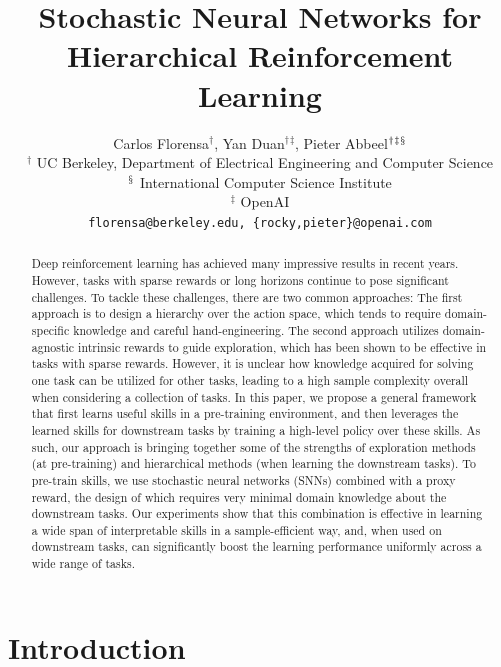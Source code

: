 \documentclass{article} %
\title{Stochastic Neural Networks for \\Hierarchical Reinforcement Learning}
\author{Carlos Florensa${^\dagger}$, Yan Duan${^\dagger}{^\ddagger}$, Pieter Abbeel${^\dagger}{^\ddagger}{^\mathsection}$ \\
$^\dagger$ UC Berkeley, Department of Electrical Engineering and Computer Science\\
$^\mathsection$ International Computer Science Institute\\
$^\ddagger$ OpenAI\\
\texttt{florensa@berkeley.edu, \{rocky,pieter\}@openai.com}
}
\begin{document}
	
	\maketitle

\begin{abstract}








Deep reinforcement learning has achieved many impressive results in recent years. However, tasks with sparse rewards or long horizons continue to pose significant challenges. To tackle these challenges, there are two common approaches: The first approach is to design a hierarchy over the action space, which tends to require domain-specific knowledge and careful hand-engineering. The second approach utilizes domain-agnostic intrinsic rewards to guide exploration, which has been shown to be effective in tasks with sparse rewards. However, it is unclear how knowledge acquired for solving one task can be utilized for other tasks, leading to a high sample complexity overall when considering a collection of tasks. In this paper, we propose a general framework that first learns useful skills in a pre-training environment, and then leverages the learned skills for downstream tasks by training a high-level policy over these skills. As such, our approach is bringing together some of the strengths of exploration methods (at pre-training) and hierarchical methods (when learning the downstream tasks).  To pre-train skills, we use stochastic neural networks (SNNs) combined with a proxy reward, the design of which requires very minimal domain knowledge about the downstream tasks. Our experiments show that this combination is effective in learning a wide span of interpretable skills in a sample-efficient way, and, when used on downstream tasks, can significantly boost the learning performance uniformly across a wide range of tasks. 


\end{abstract}

\section{Introduction}
\end{document}
